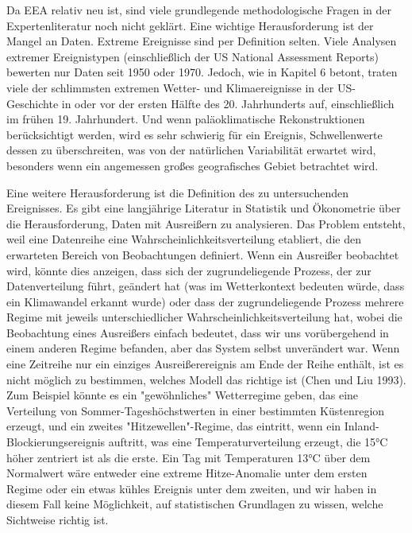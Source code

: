 \documentclass[12pt,paper=a4,DIV=12,parskip=never,chapterprefix=false,headings=standardclasses]{scrreprt}
\begin{document}
Da EEA relativ neu ist, sind viele grundlegende methodologische Fragen in der Expertenliteratur noch nicht geklärt. Eine wichtige Herausforderung ist der Mangel an Daten. Extreme Ereignisse sind per Definition selten. Viele Analysen extremer Ereignistypen (einschließlich der US National Assessment Reports) bewerten nur Daten seit 1950 oder 1970. Jedoch, wie in Kapitel 6 betont, traten viele der schlimmsten extremen Wetter- und Klimaereignisse in der US-Geschichte in oder vor der ersten Hälfte des 20. Jahrhunderts auf, einschließlich im frühen 19. Jahrhundert. Und wenn paläoklimatische Rekonstruktionen berücksichtigt werden, wird es sehr schwierig für ein Ereignis, Schwellenwerte dessen zu überschreiten, was von der natürlichen Variabilität erwartet wird, besonders wenn ein angemessen großes geografisches Gebiet betrachtet wird.

Eine weitere Herausforderung ist die Definition des zu untersuchenden Ereignisses. Es gibt eine langjährige Literatur in Statistik und Ökonometrie über die Herausforderung, Daten mit Ausreißern zu analysieren. Das Problem entsteht, weil eine Datenreihe eine Wahrscheinlichkeitsverteilung etabliert, die den erwarteten Bereich von Beobachtungen definiert. Wenn ein Ausreißer beobachtet wird, könnte dies anzeigen, dass sich der zugrundeliegende Prozess, der zur Datenverteilung führt, geändert hat (was im Wetterkontext bedeuten würde, dass ein Klimawandel erkannt wurde) oder dass der zugrundeliegende Prozess mehrere Regime mit jeweils unterschiedlicher Wahrscheinlichkeitsverteilung hat, wobei die Beobachtung eines Ausreißers einfach bedeutet, dass wir uns vorübergehend in einem anderen Regime befanden, aber das System selbst unverändert war. Wenn eine Zeitreihe nur ein einziges Ausreißerereignis am Ende der Reihe enthält, ist es nicht möglich zu bestimmen, welches Modell das richtige ist (Chen und Liu 1993). Zum Beispiel könnte es ein "gewöhnliches" Wetterregime geben, das eine Verteilung von Sommer-Tageshöchstwerten in einer bestimmten Küstenregion erzeugt, und ein zweites "Hitzewellen"-Regime, das eintritt, wenn ein Inland-Blockierungsereignis auftritt, was eine Temperaturverteilung erzeugt, die 15°C höher zentriert ist als die erste. Ein Tag mit Temperaturen 13°C über dem Normalwert wäre entweder eine extreme Hitze-Anomalie unter dem ersten Regime oder ein etwas kühles Ereignis unter dem zweiten, und wir haben in diesem Fall keine Möglichkeit, auf statistischen Grundlagen zu wissen, welche Sichtweise richtig ist.
\end{document}
